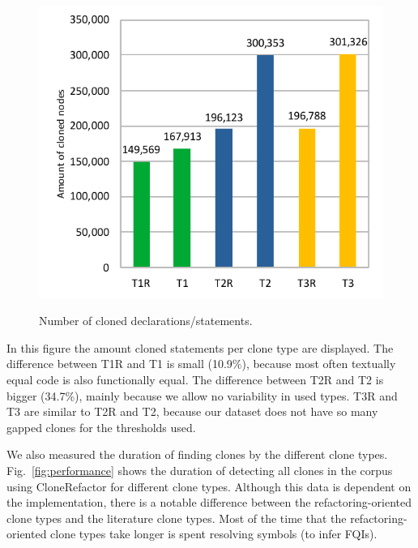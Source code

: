 \documentclass[a4paper]{article}
\begin{document}
\begin{figure}[H]
  \caption{Number of cloned declarations/statements.}
    \includegraphics[width=.96\columnwidth]{img/TypeResults}
  \label{fig:typeres}
\end{figure}

In this figure the amount cloned statements per clone type are displayed. The difference between T1R and T1 is small (10.9\%), because most often textually equal code is also functionally equal. The difference between T2R and T2 is bigger (34.7\%), mainly because we allow no variability in used types. T3R and T3 are similar to T2R and T2, because our dataset does not have so many gapped clones for the thresholds used.

We also measured the duration of finding clones by the different clone types. Fig.~\ref{fig:performance} shows the duration of detecting all clones in the corpus using CloneRefactor for different clone types. Although this data is dependent on the implementation, there is a notable difference between the refactoring-oriented clone types and the literature clone types. Most of the time that the refactoring-oriented clone types take longer is spent resolving symbols (to infer FQIs).
\end{document}
